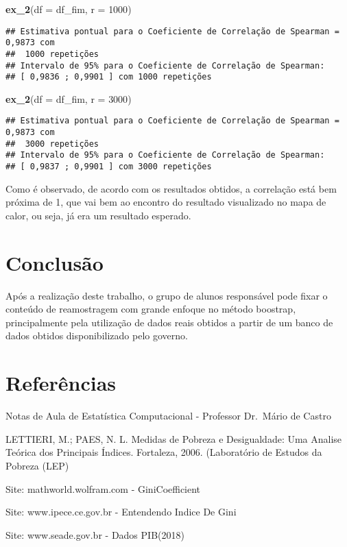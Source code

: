 \documentclass[11pt,]{article}
\newenvironment{Shaded}{\begin{snugshade}}{\end{snugshade}}
\newcommand{\DataTypeTok}[1]{\textcolor[rgb]{0.13,0.29,0.53}{#1}}
\newcommand{\DecValTok}[1]{\textcolor[rgb]{0.00,0.00,0.81}{#1}}
\newcommand{\KeywordTok}[1]{\textcolor[rgb]{0.13,0.29,0.53}{\textbf{#1}}}
\newcommand{\NormalTok}[1]{#1}
\begin{document}
\begin{Shaded}
\begin{Highlighting}[]
\KeywordTok{ex_2}\NormalTok{(}\DataTypeTok{df =}\NormalTok{ df_fim, }\DataTypeTok{r =} \DecValTok{1000}\NormalTok{)}
\end{Highlighting}
\end{Shaded}

\begin{verbatim}
## Estimativa pontual para o Coeficiente de Correlação de Spearman =  0,9873 com
##  1000 repetições
## Intervalo de 95% para o Coeficiente de Correlação de Spearman:
## [ 0,9836 ; 0,9901 ] com 1000 repetições
\end{verbatim}

\begin{Shaded}
\begin{Highlighting}[]
\KeywordTok{ex_2}\NormalTok{(}\DataTypeTok{df =}\NormalTok{ df_fim, }\DataTypeTok{r =} \DecValTok{3000}\NormalTok{)}
\end{Highlighting}
\end{Shaded}

\begin{verbatim}
## Estimativa pontual para o Coeficiente de Correlação de Spearman =  0,9873 com
##  3000 repetições
## Intervalo de 95% para o Coeficiente de Correlação de Spearman:
## [ 0,9837 ; 0,9901 ] com 3000 repetições
\end{verbatim}

Como é observado, de acordo com os resultados obtidos, a correlação está
bem próxima de 1, que vai bem ao encontro do resultado visualizado no
mapa de calor, ou seja, já era um resultado esperado.

\hypertarget{conclusuxe3o}{%
\section{Conclusão}\label{conclusuxe3o}}

Após a realização deste trabalho, o grupo de alunos responsável pode
fixar o conteúdo de reamostragem com grande enfoque no método boostrap,
principalmente pela utilização de dados reais obtidos a partir de um
banco de dados obtidos disponibilizado pelo governo.

\hypertarget{referuxeancias}{%
\section{Referências}\label{referuxeancias}}

Notas de Aula de Estatística Computacional - Professor Dr.~Mário de
Castro

LETTIERI, M.; PAES, N. L. Medidas de Pobreza e Desigualdade: Uma Analise
Teórica dos Principais Índices. Fortaleza, 2006. (Laboratório de Estudos
da Pobreza (LEP)

Site: mathworld.wolfram.com - GiniCoefficient

Site: www.ipece.ce.gov.br - Entendendo Indice De Gini

Site: www.seade.gov.br - Dados PIB(2018)
\end{document}

